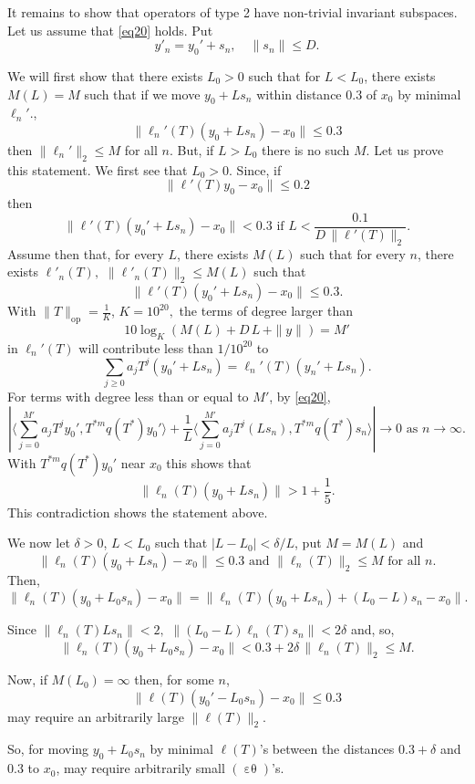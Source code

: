 \documentclass[12pt,oneside,reqno]{amsart}
\theoremstyle{definition}
\DeclareMathOperator*{\VE}{\varepsilon\theta}
\begin{document}
It remains to show that operators of type 2 have non-trivial invariant subspaces. Let us assume that \eqref{eq20} holds. Put $$y'_n = y_0' + s_n, \quad \|s_n\| \le D.$$

We will first show that there exists $L_0 > 0$ such that for $L < L_0$, there exists $M(L) = M$ such that if we move $y_0 + L s_n$ within distance $0.3$ of $x_0$ by minimal $\ell_n'$.,
$$\|\ell_{n}' (T) (y_0 + L s_n) - x_0\| \le 0.3$$
then $\|\ell_n'\|_2 \le M$ for all $n$. But, if $L > L_0$ there is no such $M$.
Let us prove this statement. We first see that $L_0>0$. Since, if 
$$\|\ell'(T) y_0 - x_0\|\le 0.2$$
then
$$\|\ell'(T) (y_0' + L s_n) - x_0\| < 0.3 \text{  if  } L < \frac{0.1}{D \, \|\ell' (T)\|_2}.$$
Assume then that, for every $L$, there exists $M(L)$ such that for every $n$, there exists $\ell'_n(T),$ $\|\ell'_n(T)\|_2 \le M(L)$ such that
$$\|\ell'(T) (y_0' + L s_n) - x_0\| \le 0.3.$$
With $\|T\|_{\text{op}} = \frac{1}{K}$, $K= 10^{20},$ the terms of degree larger than 
$$10 \log_{K} (M(L) + D \, L \, + \|y\|) = M'$$
in $\ell_n'(T)$ will contribute less than $1/10^{20}$ to 
$$\sum_{j \ge 0} a_j T^j (y_0' + L s_n) = \ell_n' (T) (y_n' + L s_n).$$
For terms with degree less than or equal to $M'$, by \eqref{eq20}, 
$$\left| \langle \sum_{j=0}^{M'} a_j T^j y_0', T^{*m} q(T^*) y_0'\rangle + \frac{1}{L} 
\langle \sum_{j=0}^{M'} a_j T^j (L s_n),  T^{*m} q(T^*) s_n\rangle \right| \longrightarrow 0 \text{ as } n \rightarrow \infty.$$
With $T^{*m} {q} (T^*)y_0'$ near $x_0$ this shows that 
$$\|\ell_n(T) (y_0 + L s_n)\| > 1 + \frac{1}{5}.$$
This contradiction shows the statement above.

We now let $\delta >0$, $L < L_0$ such that $|L - L_0| < \delta/L$, put $M = M(L)$ and
$$\|\ell_n(T) (y_0 + L s_n) - x_0\| \le 0.3 \text{ and } \|\ell_n(T)\|_2 \le M \text{ for all } n.$$
Then, 
$$\|\ell_n(T) (y_0 + L_0 s_n) - x_0\| = \|\ell_n(T) (y_0 + L s_n) + (L_0-L) s_n - x_0\|.$$

Since $\|\ell_n(T) L s_n\| < 2,$  $\|(L_0 - L) \ell_n(T) s_n\| < 2 \delta$ and, so, 
$$\|\ell_n(T) (y_0 + L_0 s_n) - x_0 \| < 0.3 + 2 \delta \, \| \ell_n(T)\|_2 \le M.$$
 
Now, if $M(L_0) = \infty$ then, for some $n$, 
$$\|\ell(T) (y_0' - L_0 s_n) - x_0\| \le 0.3$$
may require an arbitrarily large $\|\ell (T)\|_2$.

So, for moving $y_0 + L_0 s_n$ by minimal $\ell(T)$'s between the distances $0.3 + \delta$ and $0.3$ to $x_0$, may require arbitrarily small $(\VE)$'s.
\end{document}
